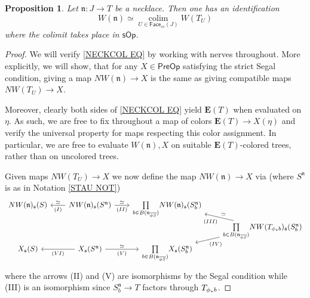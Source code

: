 \documentclass[a4paper,10pt]{article}%
\numberwithin{equation}{section}
\numberwithin{figure}{section}
\newtheorem{proposition}[equation]{Proposition}%
\theoremstyle{definition} %
\DeclareMathOperator{\colim}{colim}%
\newcommand{\1}{\ensuremath{\mathbbm 1}}%
\begin{document}
\begin{proposition}\label{NECKCOL PROP}
	Let $\mathfrak{n} \colon J \to T$ be a necklace.
	Then one has an identification
\begin{equation}\label{NECKCOL EQ}
	W(\mathfrak{n})
	\simeq 
	\underset{U \in \mathsf{Face}_{sc}(J)}{\colim}
	W(T_U)
\end{equation}
	where the colimit takes place 
	in $\mathsf{sOp}$.
\end{proposition}



\begin{proof}
	We will verify \eqref{NECKCOL EQ}
	by working with nerves throughout.
	More explicitly, 
	we will show, that for any $X\in \mathsf{PreOp}$
	satisfying the strict Segal condition,
	giving a map
	$NW(\mathfrak{n}) \to X$
	is the same as giving compatible maps
	$NW(T_U) \to X$.

	Moreover, clearly both sides of 
	\eqref{NECKCOL EQ} yield $\boldsymbol{E}(T)$
	when evaluated on $\eta$.
	As such, we are free to fix throughout
	a map of colors $\boldsymbol{E}(T) \to X(\eta)$
	and verify the universal property 
	for maps respecting this color assignment.
	In particular, we are free to 
	evaluate $W(\mathfrak{n}),X$ on suitable 
	$\boldsymbol{E}(T)$-colored trees, 
	rather than on uncolored trees.

	Given maps $NW(T_U) \to X$
	we now define the map $NW(\mathfrak{n}) \to X$ via 
	(where $S^{\mathfrak{n}}$ is as in Notation \ref{STAU NOT})
\begin{equation}\label{LONGMAP EQ}
\begin{tikzcd}[column sep = 20pt, row sep=0]
	NW(\mathfrak{n})_{\mathfrak{s}}(S)
&
	NW(\mathfrak{n})_{\mathfrak{s}}(S^{\mathfrak{n}})
	\ar{l}[swap]{\simeq}{(I)}
	\ar{r}{\simeq}[swap]{(II)}
&
	\underset{b \in B( \mathfrak{n}_{\overline{\phi S}})}{\prod}
	NW(\mathfrak{n})_{\mathfrak{s}}(S^{\mathfrak{n}}_b)
\\
&&&
	\underset{b \in B( \mathfrak{n}_{\overline{\phi S}})}{\prod}
	NW(T_{\phi_{\**}b})_{\mathfrak{s}}(S^{\mathfrak{n}}_b)
	\ar{lu}[swap]{\simeq}{(III)}
	\ar{ld}{(IV)}
\\
	X_{\mathfrak{s}}(S)
&
	X_{\mathfrak{s}}(S^{\mathfrak{n}})
	\ar{r}{\simeq}[swap]{(V)}
	\ar{l}{(VI)}
&
	\underset{b \in B(\mathfrak{n}_{\overline{\phi S}})}{\prod}
	X_{\mathfrak{s}}(S^{\mathfrak{n}}_b)
\end{tikzcd}
\end{equation}
	where the arrows (II) and (V) are isomorphisms by the Segal condition
	while (III) is an isomorphism since 
	$S_b^{\mathfrak{n}} \to T$ factors through 
	$T_{\phi_{\**}b}$.
	

\end{proof}
\end{document}
